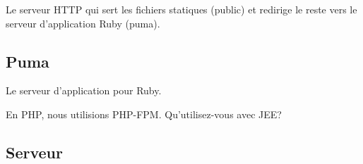 Le serveur HTTP qui sert les fichiers statiques (public) et redirige le
reste vers le serveur d'application Ruby (puma).

\hypertarget{puma}{%
\subsection{Puma}\label{puma}}

Le serveur d'application pour Ruby.

\begin{english}

\begin{Shaded}
\begin{Highlighting}[]



\end{Highlighting}
\end{Shaded}

\end{english}

En PHP, nous utilisions PHP-FPM. Qu'utilisez-vous avec JEE?

\hypertarget{serveur}{%
\subsection{Serveur}\label{serveur}}

\begin{english}

\begin{Shaded}
\begin{Highlighting}[]
\NormalTok{$ }

\NormalTok{$ }
\NormalTok{[}\NormalTok{]}
\end{Highlighting}
\end{Shaded}

\end{english}

